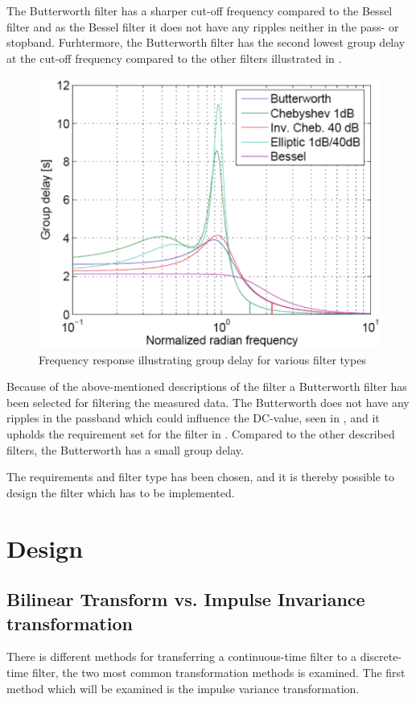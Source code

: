 The Butterworth filter has a sharper cut-off frequency compared to the Bessel filter and as the Bessel filter it does not have any ripples neither in the pass- or stopband. Furhtermore, the Butterworth filter has the second lowest group delay at the cut-off frequency compared to the other filters illustrated in . 

\begin{figure}[H]
	\centering
	\includegraphics[scale=0.7]{figures/Filtertypes2.pdf}
	\caption{Frequency response illustrating group delay for various filter types}
	\label{fig:groupdelay}
\end{figure}

Because of the above-mentioned descriptions of the filter a Butterworth filter has been selected for filtering the measured data. The Butterworth does not have any ripples in the passband which could influence the DC-value, seen in , and it upholds the requirement set for the filter in . Compared to the other described filters, the Butterworth has a small group delay.

The requirements and filter type has been chosen, and it is thereby possible to design the filter which has to be implemented.

\section{Design}

\subsection{Bilinear Transform vs. Impulse Invariance transformation}
There is different methods for transferring a continuous-time filter to a discrete-time filter, the two most common transformation methods is examined. The first method which will be examined is the impulse variance transformation.

